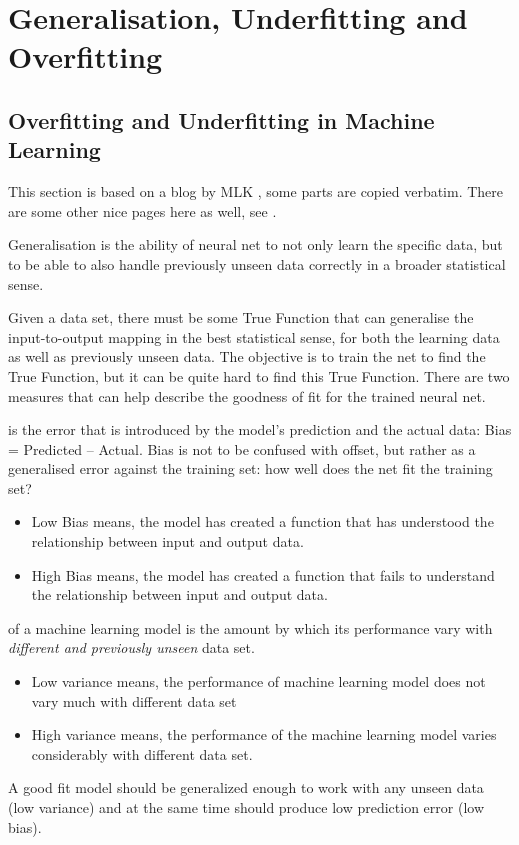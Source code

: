 
\chapter{Generalisation, Underfitting and Overfitting}
\label{sec:UnderfittingandOverfitting}

\section{Overfitting and Underfitting in Machine Learning}

This section is based on a blog by MLK \cite{MLK2019}, some parts are copied verbatim. There are some other nice pages here as well, see \cite{MLK2018}.

Generalisation is the ability of  neural net to not only learn the specific data, but to be able to also handle previously unseen data correctly in a broader statistical sense. 

Given a data set, there must be some True Function that can generalise the input-to-output mapping in the best statistical sense, for both the learning data as well as previously unseen data.  The objective is to train the net to find the True Function, but it can be quite hard to find this True Function.
There are two measures that can help describe the goodness of fit for the trained neural net.

 is the error that is introduced by the model's prediction and the actual data: Bias = Predicted – Actual.  Bias is not to be confused with offset, but rather as a generalised error against the training set: how well does the net fit the training set?
\begin{itemize}
\item Low Bias means, the model has created a function that has understood the relationship between input and output data.
\item  High Bias means, the model has created a function that fails to understand the relationship between input and output data.
\end{itemize}

 of a machine learning model is the amount by which its performance vary with \textit{different and previously unseen} data set.
\begin{itemize}
\item  Low variance means, the performance of machine learning model does not vary much with different data set
\item  High variance means, the performance of the machine learning model varies considerably with different data set.
\end{itemize}
A good fit model should be generalized enough to work with any unseen data (low variance) and at the same time should produce low prediction error (low bias).

